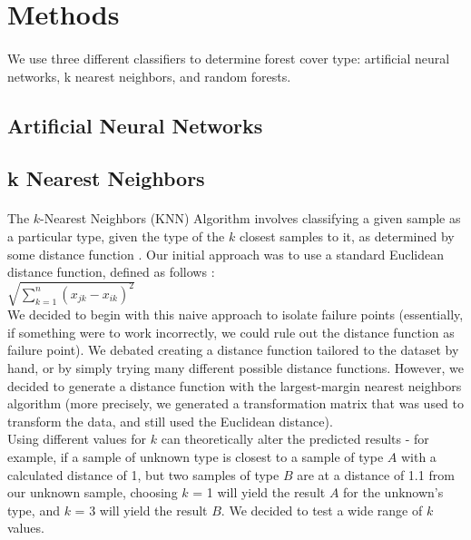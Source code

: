 \documentclass[11pt]{article}
\begin{document}
    \section{Methods}
    \paragraph{}
    We use three different classifiers to determine forest cover type: artificial neural networks, k nearest neighbors, and random forests.
    \subsection{Artificial Neural Networks}
    \subsection{k Nearest Neighbors}
    \paragraph{}
    The $k$-Nearest Neighbors (KNN) Algorithm involves classifying a given sample as a particular type, given the type of the $k$ closest samples to it, as determined by some distance function \cite{matlabpage}. Our initial approach was to use a standard Euclidean distance function, defined as follows \cite{sayad} :
    \\
    $\sqrt{\sum\limits_{k = 1}^n (x_{jk} - x_{ik})^2}$
    \\
    We decided to begin with this naive approach to isolate failure points (essentially, if something were to work incorrectly, we could rule out the distance function as failure point).
    We debated creating a distance function tailored to the dataset by hand, or by simply trying many different possible distance functions. However, we decided to generate a distance function with the largest-margin nearest neighbors algorithm (more precisely, we generated a transformation matrix that was used to transform the data, and still used the Euclidean distance).
    \\
    Using different values for $k$ can theoretically alter the predicted results - for example, if a sample of unknown type is closest to a sample of type $A$ with a calculated distance of 1, but two samples of type $B$ are at a distance of 1.1 from our unknown sample, choosing $k$ = 1 will yield the result $A$ for the unknown's type, and $k$ = 3 will yield the result $B$. We decided to test a wide range of $k$ values.
     
\end{document}
